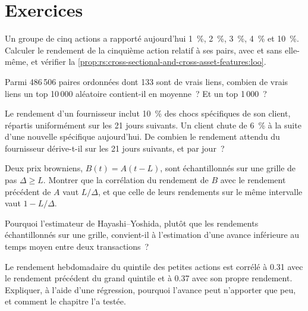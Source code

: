 \section{Exercices}

\begin{exercise}[$\star$]\label{exo:rs:cross-sectional-and-cross-asset-features:1}
Un groupe de cinq actions a rapporté aujourd'hui 1~\%, 2~\%, 3~\%, 4~\% et 10~\%. Calculer le rendement de la cinquième action relatif à ses pairs, avec et
sans elle-même, et vérifier la \cref{prop:rs:cross-sectional-and-cross-asset-features:loo}.
\end{exercise}

\begin{exercise}[$\star$]\label{exo:rs:cross-sectional-and-cross-asset-features:2}
Parmi 486\,506 paires ordonnées dont 133 sont de vrais liens, combien de vrais liens un top 10\,000 aléatoire contient-il en moyenne~? Et un top
1\,000~?
\end{exercise}

\begin{exercise}[$\star$]\label{exo:rs:cross-sectional-and-cross-asset-features:3}
Le rendement d'un fournisseur inclut 10~\% des chocs spécifiques de son client, répartis uniformément sur les 21 jours suivants. Un client chute de 6~\%
à la suite d'une nouvelle spécifique aujourd'hui. De combien le rendement attendu du fournisseur dérive-t-il sur les 21 jours suivants, et par jour~?
\end{exercise}

\begin{exercise}[$\star\star$]\label{exo:rs:cross-sectional-and-cross-asset-features:4}
Deux prix browniens, $B(t) = A(t - L)$, sont échantillonnés sur une grille de pas $\Delta \ge L$. Montrer que la corrélation du rendement de $B$ avec
le rendement précédent de $A$ vaut $L/\Delta$, et que celle de leurs rendements sur le même intervalle vaut $1 - L/\Delta$.
\end{exercise}

\begin{exercise}[$\star\star$]\label{exo:rs:cross-sectional-and-cross-asset-features:5}
Pourquoi l'estimateur de Hayashi--Yoshida, plutôt que les rendements échantillonnés sur une grille, convient-il
à l'estimation d'une avance inférieure au temps moyen entre deux transactions~?
\end{exercise}

\begin{exercise}[$\star\star$]\label{exo:rs:cross-sectional-and-cross-asset-features:6}
Le rendement hebdomadaire du quintile des petites actions est corrélé à 0.31 avec le rendement précédent du grand quintile et à 0.37 avec son propre rendement. Expliquer, à l'aide d'une
régression, pourquoi l'avance peut n'apporter que peu, et comment le chapitre l'a testée.
\end{exercise}

